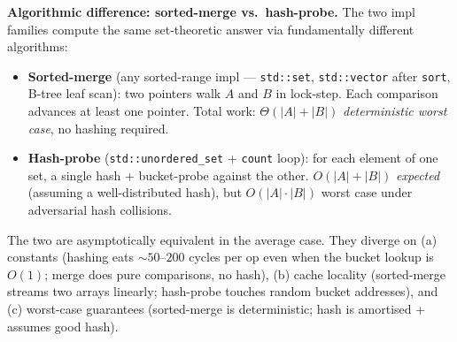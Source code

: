 \documentclass[11pt]{article}
\begin{document}
\begin{defnbox}
\textbf{Algorithmic difference: sorted-merge vs.\ hash-probe.} The
two impl families compute the same set-theoretic answer via
fundamentally different algorithms:

\begin{itemize}[leftmargin=*]
    \item \textbf{Sorted-merge} (any sorted-range impl ---
          \texttt{std::set}, \texttt{std::vector} after \texttt{sort},
          B-tree leaf scan): two pointers walk $A$ and $B$ in
          lock-step. Each comparison advances at least one pointer.
          Total work: $\Theta(|A| + |B|)$
          \emph{deterministic worst case}, no hashing required.
    \item \textbf{Hash-probe} (\texttt{std::unordered\_set} +
          \texttt{count} loop): for each element of one set, a
          single hash + bucket-probe against the other.
          $O(|A| + |B|)$ \emph{expected} (assuming a well-distributed
          hash), but $O(|A| \cdot |B|)$ worst case under adversarial
          hash collisions.
\end{itemize}

The two are asymptotically equivalent in the average case. They
diverge on (a) constants (hashing eats $\sim 50$--$200$ cycles per
op even when the bucket lookup is $O(1)$; merge does pure
comparisons, no hash), (b) cache locality (sorted-merge streams two
arrays linearly; hash-probe touches random bucket addresses), and
(c) worst-case guarantees (sorted-merge is deterministic; hash is
amortised + assumes good hash).
\end{defnbox}
\end{document}
